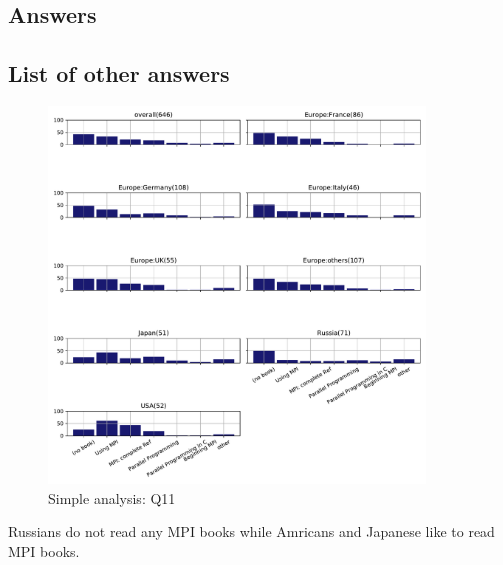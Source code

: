
\subsection{Answers}


\subsection{List of other answers}
\begin{itemize}

\end{itemize}

\begin{figure}[htb]
\begin{center}
\includegraphics[width=10cm]{../pdfs/Q11.pdf}
\caption{Simple analysis: Q11}
\label{fig:Q11}
\end{center}
\end{figure}

Russians do not read any MPI books while Amricans and Japanese like to
read MPI books. 
